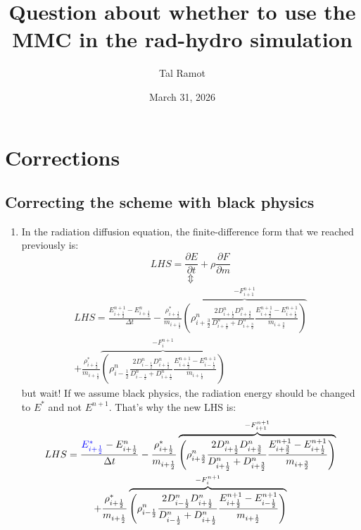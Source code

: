 \documentclass[11pt]{article}
\title{Question about whether to use the MMC in the rad-hydro simulation}
\author{Tal Ramot}
\date{March 31, 2026}
\begin{document}
\maketitle

\section{Corrections}
\subsection{Correcting the scheme with black physics}
\begin{enumerate}
  \item In the radiation diffusion equation, the finite-difference form that we reached previously is:
  \begin{equation}
      LHS = \frac{\partial{E}}{\partial t}+\rho \frac{\partial F}{\partial m} 
    \end{equation}  
  \begin{equation} \Updownarrow \end{equation}
  \begin{equation}
    \begin{gathered}
  LHS = \frac{E_{i+\frac{1}{2}}^{n+1} - E_{i+\frac{1}{2}}^n}{\Delta t} - \frac{\rho_{i+\frac{1}{2}}^{*}}{m_{i+\frac{1}{2}}} \overbrace{\left(\rho_{i+\frac{3}{2}}^n \frac{2D_{i+\frac{1}{2}}^{n} D_{i+\frac{3}{2}}^{n}}{D_{i+\frac{1}{2}}^{n} + D_{i+\frac{3}{2}}^{n}}\frac{E_{i+\frac{3}{2}}^{n+1} - E_{i+\frac{1}{2}}^{n+1}}{m_{i+\frac{3}{2}}}\right)}^{-F_{i+1}^{n+1}} \\ + \frac{\rho_{i+\frac{1}{2}}^{*}}{m_{i+\frac{1}{2}}}\overbrace{\left(\rho_{i-\frac{1}{2}}^n \frac{2D_{i-\frac{1}{2}}^{n} D_{i+\frac{1}{2}}^{n}}{D_{i-\frac{1}{2}}^{n} + D_{i+\frac{1}{2}}^{n}}\frac{E_{i+\frac{1}{2}}^{n+1} - E_{i-\frac{1}{2}}^{n+1}}{m_{i+\frac{1}{2}}}\right)}^{-F_{i}^{n+1}}
  \end{gathered}
  \end{equation}
  but wait! If we assume black physics, the radiation energy should be changed to $E^*$ and not $E^{n+1}$. That's why the new LHS is:
  \begin{equation}
    \begin{gathered}
  LHS = \frac{\textcolor{blue}{E_{i+\frac{1}{2}}^{*}} - E_{i+\frac{1}{2}}^n}{\Delta t} - \frac{\rho_{i+\frac{1}{2}}^{*}}{m_{i+\frac{1}{2}}} \overbrace{\left(\rho_{i+\frac{3}{2}}^n \frac{2D_{i+\frac{1}{2}}^{n} D_{i+\frac{3}{2}}^{n}}{D_{i+\frac{1}{2}}^{n} + D_{i+\frac{3}{2}}^{n}}\frac{E_{i+\frac{3}{2}}^{n+1} - E_{i+\frac{1}{2}}^{n+1}}{m_{i+\frac{3}{2}}}\right)}^{-F_{i+1}^{n+1}} \\ + \frac{\rho_{i+\frac{1}{2}}^{*}}{m_{i+\frac{1}{2}}}\overbrace{\left(\rho_{i-\frac{1}{2}}^n \frac{2D_{i-\frac{1}{2}}^{n} D_{i+\frac{1}{2}}^{n}}{D_{i-\frac{1}{2}}^{n} + D_{i+\frac{1}{2}}^{n}}\frac{E_{i+\frac{1}{2}}^{n+1} - E_{i-\frac{1}{2}}^{n+1}}{m_{i+\frac{1}{2}}}\right)}^{-F_{i}^{n+1}}
  \end{gathered}
  \end{equation}
  

\end{enumerate}
\end{document}
